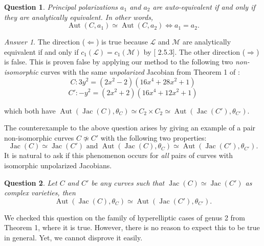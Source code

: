 \documentclass[12pt,reqno]{amsart}
\DeclareMathOperator{\Aut}{Aut}
\DeclareMathOperator{\Jac}{Jac}
\newcommand{\mc}{\mathcal}
\newtheorem*{question}{Question}
\theoremstyle{definition}
\theoremstyle{remark}
\newtheorem*{answer}{Answer}
\begin{document}
\begin{question} Principal polarizations $a_1$ and $a_2$ are auto-equivalent if and only if they are analytically equivalent. In other words, $$\Aut(C, a_1) \simeq \Aut(C, a_2) \Leftrightarrow a_1 = a_2.$$ \end{question}

\begin{answer} The direction ($\Leftarrow$) is true because $\mc{L}$ and $\mc{M}$ are analytically equivalent if and only if $c_1(\mc{L}) = c_1(\mc{M})$ by [\cite{bl} 2.5.3]. The other direction ($\Rightarrow$) is false.  This is proven false by applying our method to the following two \textit{non-isomorphic} curves with the same \textit{unpolarized} Jacobian from Theorem 1 of \cite{howe1}:
\vspace{-2pt}
$$C: 3y^2 = (2x^2- 2)(16x^4 + 28x^2 + 1)$$ 
\vspace{-15pt}
$$C': -y^2 = (2x^2 + 2)(16x^4 + 12x^2 + 1)$$ 

\noindent which both have $\Aut(\Jac(C), \theta_C)\simeq C_2 \times C_2 \simeq \Aut(\Jac(C'), \theta_{C'})$. \end{answer}

The counterexample to the above question arises by giving an example of a pair non-isomorphic curves $C \nsimeq C'$ with the following two properties: $$\Jac(C) \simeq \Jac(C') \text{  and  }  \Aut(\Jac(C), \theta_C) \simeq \Aut(\Jac(C'), \theta_{C'}).$$ It is natural to ask if this phenomenon occurs for \textit{all} pairs of curves with isomorphic unpolarized Jacobians. %

\begin{question} Let $C$ and $C'$ be any curves such that $\Jac(C) \simeq \Jac(C')$ as complex varieties, then $$\Aut(\Jac(C), \theta_C) \simeq \Aut(\Jac(C'), \theta_{C'}).$$  \end{question} 

We checked this question on the family of hyperelliptic cases of genus 2 from \cite{howe1} Theorem 1, where it is true. However, there is no reason to expect this to be true in general. Yet, we cannot disprove it easily. 
\end{document}
